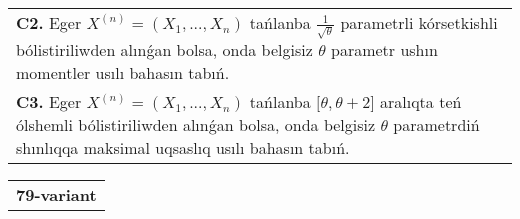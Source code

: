 \documentclass{article}
\begin{document}
\begin{tabular}{m{17cm}}
 \\
\textbf{C2.} 
Eger \(X^{(n)} = \left( X_{1},...,X_{n} \right)\) tańlanba \(\frac{1}{\sqrt{\theta}}\) parametrli kórsetkishli bólistiriliwden alınǵan bolsa, onda belgisiz \(\theta\) parametr ushın momentler usılı bahasın tabıń.
 \\
\textbf{C3.} 
Eger \(X^{(n)} = \left( X_{1},...,X_{n} \right)\) tańlanba \(\lbrack\theta,\theta + 2\rbrack\) aralıqta teń ólshemli bólistiriliwden alınǵan bolsa, onda belgisiz \(\theta\) parametrdiń shınlıqqa maksimal uqsaslıq usılı bahasın tabıń.
 \\

\end{tabular}
\vspace{1cm}


\begin{tabular}{m{17cm}}
\textbf{79-variant}
\newline


\end{tabular}
\end{document}
